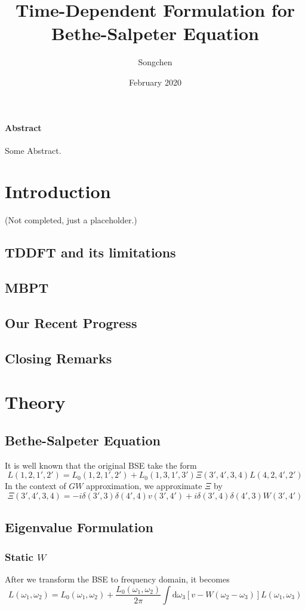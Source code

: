 \documentclass{article}
\title{Time-Dependent Formulation for Bethe-Salpeter Equation}
\author{Songchen}
\date{February 2020}
\begin{document}
\maketitle
\paragraph{Abstract} Some Abstract.
\twocolumn
\section{Introduction}
(Not completed, just a placeholder.)
\subsection{TDDFT and its limitations}
\subsection{MBPT}
\subsection{Our Recent Progress}
\subsection{Closing Remarks}
\section{Theory}
\subsection{Bethe-Salpeter Equation}
It is well known that the original BSE take the form
$$
L(1,2,1',2')=L_0(1,2,1',2')+L_0(1,3,1',3') \Xi(3',4',3,4)L(4,2,4',2')
$$
In the context of $GW$ approximation, we approximate $\Xi$ by
$$
\Xi(3',4',3,4)=-i\delta(3',3)\delta(4',4)v(3',4')+i\delta(3',4)\delta(4',3)W(3',4')
$$
\subsection{Eigenvalue Formulation}
\subsubsection{Static $W$}
After we transform the BSE to frequency domain, it becomes
$$
L(\omega_1,\omega_2)=L_0(\omega_1,\omega_2)+\frac{L_0(\omega_1,\omega_2)}{2\pi}\int\mathrm d\omega_3[v-W(\omega_2-\omega_3)]L(\omega_1,\omega_3)
$$
\end{document}
